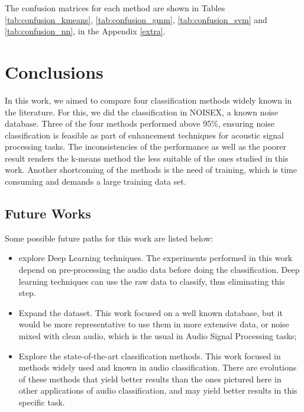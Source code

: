 \documentclass[12pt]{article}
\begin{document}
The confusion matrices for each method are shown in Tables \ref{tab:confusion_kmeans}, \ref{tab:confusion_gmm}, \ref{tab:confusion_svm} and \ref{tab:confusion_nn}, in the Appendix \ref{extra}.

\section{Conclusions} \label{conc}

In this work, we aimed to compare four classification methods widely known in the literature. For this, we did the classification in NOISEX, a known noise database. Three of the four methods performed above 95\%, ensuring noise classification is feasible as part of enhancement techniques for acoustic signal processing tasks. The inconsistencies of the performance as well as the poorer result renders the k-means method the less suitable of the ones studied in this work. Another shortcoming of the methods is the need of training, which is time consuming and demands a large training data set.

\subsection{Future Works}

Some possible future paths for this work are listed below:

\begin{itemize}
	\item explore Deep Learning techniques. The experiments performed in this work depend on pre-processing the audio data before doing the classification. Deep learning techniques can use the raw data to classify, thus eliminating this step. 
	\item Expand the dataset. This work focused on a well known database, but it would be more representative to use them in more extensive data, or noise mixed with clean audio, which is the usual in Audio Signal Processing tasks;
	\item Explore the state-of-the-art classification methods. This work focused in methods widely used and known in audio classification. There are evolutions of these methods that yield better results than the ones pictured here in other applications of audio classification, and may yield better results in this specific task.
\end{itemize}

\end{document}
